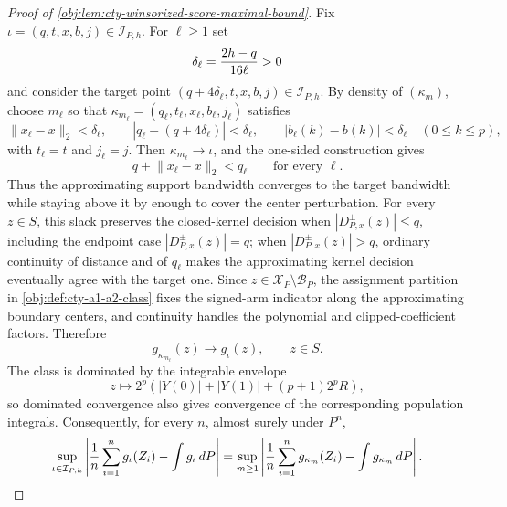 \begin{proof}[Proof of \cref{obj:lem:cty-winsorized-score-maximal-bound}]
Fix \(\iota=(q,t,x,b,j)\in\mathcal I_{P,h}\).  For \(\ell\geq1\) set
\[
\delta_\ell={2h-q\over 16\ell}>0
\]
and consider the target point \((q+4\delta_\ell,t,x,b,j)\in\mathcal I_{P,h}\).  By density of \((\kappa_m)\), choose \(m_\ell\) so that \(\kappa_{m_\ell}=(q_\ell,t_\ell,x_\ell,b_\ell,j_\ell)\) satisfies
\[
\lVert x_\ell-x\rVert_2<\delta_\ell,
\qquad
|q_\ell-(q+4\delta_\ell)|<\delta_\ell,
\qquad
|b_\ell(k)-b(k)|<\delta_\ell\quad(0\leq k\leq p),
\]
with \(t_\ell=t\) and \(j_\ell=j\).  Then \(\kappa_{m_\ell}\to\iota\), and the one-sided construction gives
\[
q+\lVert x_\ell-x\rVert_2<q_\ell
\qquad\text{for every }\ell .
\]
Thus the approximating support bandwidth converges to the target bandwidth while staying above it by enough to cover the center perturbation.  For every \(z\in S\), this slack preserves the closed-kernel decision when \(|D^{\pm}_{P,x}(z)|\leq q\), including the endpoint case \(|D^{\pm}_{P,x}(z)|=q\); when \(|D^{\pm}_{P,x}(z)|>q\), ordinary continuity of distance and of \(q_\ell\) makes the approximating kernel decision eventually agree with the target one.  Since \(z\in\mathcal X_P\setminus\mathcal B_P\), the assignment partition in \cref{obj:def:cty-a1-a2-class} fixes the signed-arm indicator along the approximating boundary centers, and continuity handles the polynomial and clipped-coefficient factors.  Therefore
\[
g_{\kappa_{m_\ell}}(z)\longrightarrow g_\iota(z),
\qquad z\in S .
\]
The class is dominated by the integrable envelope
\[
z\mapsto 2^p\left(|Y(0)|+|Y(1)|+(p+1)2^pR\right),
\]
so dominated convergence also gives convergence of the corresponding population integrals.  Consequently, for every \(n\), almost surely under \(P^n\),
\[
\sup_{\iota\in\mathcal I_{P,h}}
\left|
{1\over n}\sum_{i=1}^n g_\iota(Z_i)-\int g_\iota\,dP
\right|
=
\sup_{m\geq1}
\left|
{1\over n}\sum_{i=1}^n g_{\kappa_m}(Z_i)-\int g_{\kappa_m}\,dP
\right| .
\]


\end{proof}
